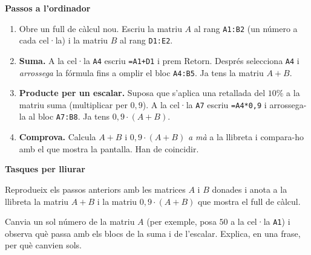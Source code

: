\begin{idea}
\textbf{Passos a l'ordinador}
\begin{enumerate}[leftmargin=1.8em, itemsep=3pt]
  \item Obre un full de càlcul nou. Escriu la matriu $A$ al rang \texttt{A1:B2}
        (un número a cada cel·la) i la matriu $B$ al rang \texttt{D1:E2}.
  \item \textbf{Suma.} A la cel·la \texttt{A4} escriu \texttt{=A1+D1} i prem Retorn.
        Després selecciona \texttt{A4} i \emph{arrossega} la fórmula fins a omplir
        el bloc \texttt{A4:B5}. Ja tens la matriu $A+B$.
  \item \textbf{Producte per un escalar.} Suposa que s'aplica una retallada del
        $10\%$ a la matriu suma (multiplicar per $0{,}9$). A la cel·la \texttt{A7}
        escriu \texttt{=A4*0,9} i arrossega-la al bloc \texttt{A7:B8}. Ja tens
        $0{,}9\cdot(A+B)$.
  \item \textbf{Comprova.} Calcula $A+B$ i $0{,}9\cdot(A+B)$ \emph{a mà} a la
        llibreta i compara-ho amb el que mostra la pantalla. Han de coincidir.
\end{enumerate}
\end{idea}

\textbf{Tasques per lliurar}
\begin{exercicis}
\begin{exlist}
  \item Reprodueix els passos anteriors amb les matrices $A$ i $B$ donades i
        anota a la llibreta la matriu $A+B$ i la matriu $0{,}9\cdot(A+B)$ que
        mostra el full de càlcul.
  \item Canvia un sol número de la matriu $A$ (per exemple, posa $50$ a la cel·la
        \texttt{A1}) i observa què passa amb els blocs de la suma i de l'escalar.
        Explica, en una frase, per què canvien sols.
\end{exlist}
\end{exercicis}

